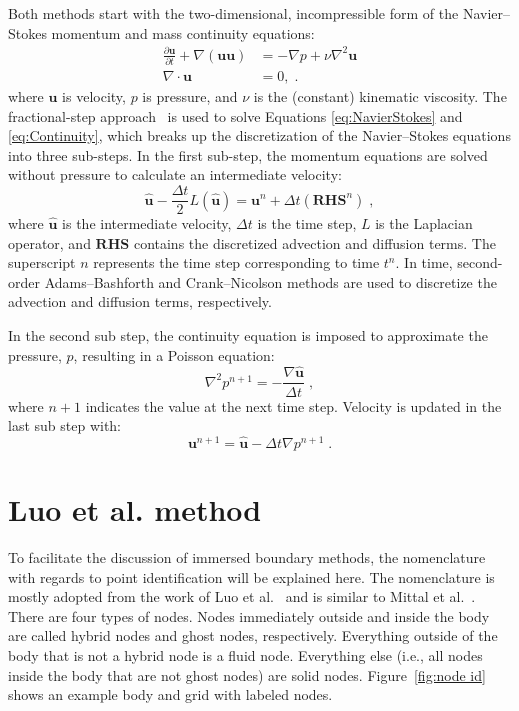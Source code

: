 Both methods start with the two-dimensional, incompressible form of the Navier--Stokes momentum and mass continuity equations:
\begin{align}
\frac{\partial \textbf{u}}{\partial t} + \nabla ( \textbf{uu} ) &= -\nabla p + \nu\nabla^{2}\textbf{u} \label{eq:NavierStokes} \\
\nabla \cdot \textbf{u} &= 0, \label{eq:Continuity} \;.
\end{align}
where $\textbf{u}$ is velocity, $p$ is pressure, and $\nu$ is the (constant) kinematic viscosity.
The fractional-step approach~\cite{Perot1993} is used to solve Equations \eqref{eq:NavierStokes} and \eqref{eq:Continuity}, which breaks up the discretization of the Navier--Stokes equations into three sub-steps.
In the first sub-step, the momentum equations are solved without pressure to  calculate an intermediate velocity:
\begin{equation}\label{eq:Intermediate Velocity}
\hat{\textbf{u}} - \frac{\Delta t}{2}L(\hat{\textbf{u}}) = \textbf{u}^n + \Delta t(\textbf{RHS}^n) \;,
\end{equation}
where $\hat{\textbf{u}}$ is the intermediate velocity, $\Delta t$ is the time step, $L$ is the Laplacian operator, and $\textbf{RHS}$ contains the discretized advection and diffusion terms. 
The superscript $n$ represents the time step corresponding to time $t^n$. 
In time, second-order Adams--Bashforth and Crank--Nicolson methods are used to discretize the advection and diffusion terms, respectively. 

In the second sub step, the continuity equation is imposed to approximate the pressure, $p$, resulting in a Poisson equation:
\begin{equation}\label{eq:Poisson}
\nabla^2p^{n+1} = - \frac{\nabla\hat{\textbf{u}}}{\Delta t} \;,
\end{equation}
\newline where $n+1$ indicates the value at the next time step. 
Velocity is updated in the last sub step with:
\begin{equation}\label{eq:Projection}
\textbf{u}^{n+1} = \hat{\textbf{u}} - \Delta t\nabla p^{n+1} \;.
\end{equation}

\section{Luo et al. method}
To facilitate the discussion of immersed boundary methods, the nomenclature with regards to point identification will be explained here. 
The nomenclature is mostly adopted from the work of Luo et al.~\cite{Luo:2012gx} and is similar to Mittal et al.~\cite{Mittal:2005ii}. 
There are four types of nodes. 
Nodes immediately outside and inside the body are called hybrid nodes and ghost nodes, respectively. 
Everything outside of the body that is not a hybrid node is a fluid node. 
Everything else (i.e., all nodes inside the body that are not ghost nodes) are solid nodes.
Figure~\ref{fig:node id} shows an example body and grid with labeled nodes. 

